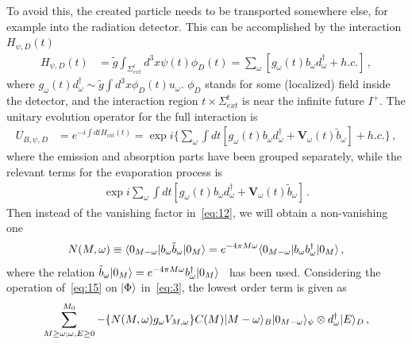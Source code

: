 \documentclass[12pt,a4paper]{article}
\begin{document}
To avoid this, the created particle needs to be transported somewhere else, for example into the radiation detector. This can be accomplished by the
interaction $H_{\psi,D}(t)$
\begin{equation}
\label{eq:13}
\begin{split}
H_{\psi,D}(t) &= \tilde{g}\int_{\Sigma_{ext}^t} d^3x\psi(t)\phi_D(t)= \sum_{\omega}[g_{\omega}(t)b_{\omega}
d_{\omega}^{\dag}+h.c.]\,,
\end{split}
\end{equation}
where $g_{\omega}(t)d_{\omega}^{\dag}\sim \tilde{g}\int d^3x\phi_D(t)u_{\omega}$. $\phi_D$ stands for some (localized) field inside the detector, and the
interaction region $t\times \Sigma_{ext}^t$ is near the infinite future
$I^+$. The unitary evolution operator for the full interaction is
\begin{equation}
\label{eq:14}
\begin{split}
U_{B,\psi,D} &= e^{-i\int dtH_{int}(t)}=\exp i\Big\{\sum_{\omega}\int
dt[g_{\omega}(t)b_{\omega}
d_{\omega}^{\dag}+\mathbf{V}_{\omega}(t)\tilde{b}_{\omega}]+h.c.\Big\}
\,,
\end{split}
\end{equation}
where the emission and absorption parts have been grouped separately, while the relevant terms for the evaporation process is
\begin{equation}
\label{eq:15}
\begin{split}
\exp i\sum_{\omega}\int dt[g_{\omega}(t)b_{\omega}
d_{\omega}^{\dag}+\mathbf{V}_{\omega}(t)\tilde{b}_{\omega}] \,.
\end{split}
\end{equation}
Then instead of the vanishing factor in~\eqref{eq:12}, we will
obtain a non-vanishing one
\begin{equation}
\label{eq:16}
\begin{split}
N(M,\omega)\equiv \langle0_{M-\omega}\arrowvert
b_{\omega}\tilde{b}_{\omega}\arrowvert0_M\rangle=e^{-4\pi
M\omega}\langle0_{M-\omega}\arrowvert
b_{\omega}b_{\omega}^{\dag}\arrowvert0_M\rangle  \,,
\end{split}
\end{equation}
where the relation $\tilde{b}_{\omega}\arrowvert0_M\rangle=e^{-4\pi
M\omega}b_{\omega}^{\dag}\arrowvert0_M\rangle$~\cite{j} has been
used. Considering the operation of~\eqref{eq:15} on
$\arrowvert\Phi\rangle$ in~\eqref{eq:3}, the lowest order term is given as
\begin{equation}
\label{eq:17}
\begin{split}
\sum_{M\geq\omega;\omega,E\geq 0}^{M_0}-\{N(M,\omega)g_{\omega}V_{M,\omega}\}C(M)
\arrowvert
M-\omega\rangle_{B}\arrowvert0_{M-\omega}\rangle_{\psi}\otimes
d_{\omega}^{\dag}\arrowvert E\rangle_D \,,
\end{split}
\end{equation}
\end{document}
